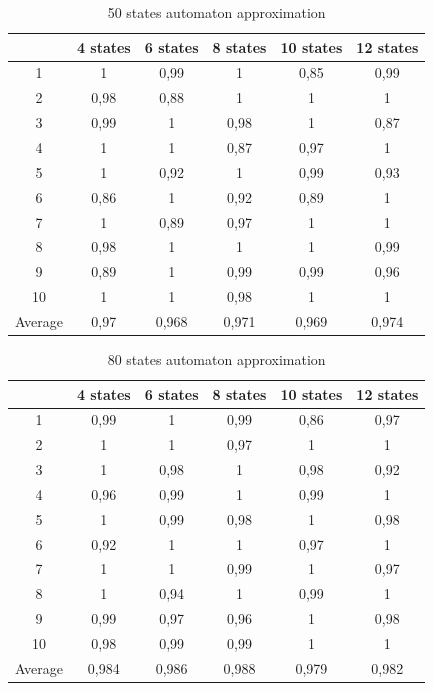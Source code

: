 \documentclass[runningheads,a4paper]{llncs}
\begin{document}
\begin{table}[]
\centering
\caption{50 states automaton approximation}
\label{my-label}
\begin{tabular}{@{}cccccc@{}}
\toprule
        & 4 states & 6 states & 8 states & 10 states & 12 states    \\ \midrule
1       & 1        & 0,99     & 1        & 0,85      & 0,99 \\
2       & 0,98     & 0,88     & 1        & 1         & 1 \\
3       & 0,99     & 1        & 0,98     & 1         & 0,87 \\
4       & 1        & 1        & 0,87     & 0,97      & 1   \\
5       & 1        & 0,92     & 1        & 0,99      & 0,93   \\
6       & 0,86     & 1        & 0,92     & 0,89      & 1    \\
7       & 1        & 0,89     & 0,97     & 1         & 1    \\
8       & 0,98     & 1        & 1        & 1         & 0,99    \\
9       & 0,89     & 1        & 0,99     & 0,99      & 0,96 \\
10      & 1        & 1        & 0,98     & 1         & 1  \\
Average & 0,97    & 0,968     & 0,971    & 0,969     & 0,974  \\ \bottomrule
\end{tabular}
\end{table}


\begin{table}[]
\centering
\caption{80 states automaton approximation}
\label{my-label}
\begin{tabular}{@{}cccccc@{}}
\toprule
        & 4 states & 6 states & 8 states & 10 states & 12 states    \\ \midrule
1       & 0,99     & 1        & 0,99     & 0,86      & 0,97 \\
2       & 1        & 1        & 0,97     & 1         & 1 \\
3       & 1        & 0,98     & 1        & 0,98      & 0,92 \\
4       & 0,96     & 0,99     & 1        & 0,99      & 1   \\
5       & 1        & 0,99     & 0,98     & 1         & 0,98   \\
6       & 0,92     & 1        & 1        & 0,97      & 1    \\
7       & 1        & 1        & 0,99     & 1         & 0,97    \\
8       & 1        & 0,94     & 1        & 0,99      & 1    \\
9       & 0,99     & 0,97     & 0,96     & 1         & 0,98 \\
10      & 0,98     & 0,99     & 0,99     & 1         & 1  \\
Average & 0,984    & 0,986    & 0,988    & 0,979     & 0,982  \\ \bottomrule
\end{tabular}
\end{table}
\end{document}
